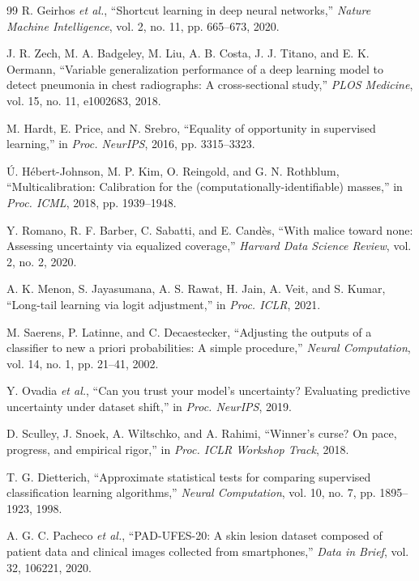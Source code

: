 \documentclass[journal]{IEEEtran}
\begin{document}
\begin{thebibliography}{99}
 R. Geirhos \emph{et al.}, ``Shortcut learning in deep neural
networks,'' \emph{Nature Machine Intelligence}, vol. 2, no. 11, pp. 665--673, 2020.

 J. R. Zech, M. A. Badgeley, M. Liu, A. B. Costa, J. J. Titano,
and E. K. Oermann, ``Variable generalization performance of a deep learning model to detect
pneumonia in chest radiographs: A cross-sectional study,'' \emph{PLOS Medicine}, vol. 15,
no. 11, e1002683, 2018.

 M. Hardt, E. Price, and N. Srebro, ``Equality of opportunity in
supervised learning,'' in \emph{Proc. NeurIPS}, 2016, pp. 3315--3323.

 \'{U}. H\'{e}bert-Johnson, M. P. Kim, O.
Reingold, and G. N. Rothblum, ``Multicalibration: Calibration for the
(computationally-identifiable) masses,'' in \emph{Proc. ICML}, 2018, pp. 1939--1948.

 Y. Romano, R. F. Barber, C. Sabatti, and E. Cand\`{e}s, ``With
malice toward none: Assessing uncertainty via equalized coverage,'' \emph{Harvard Data
Science Review}, vol. 2, no. 2, 2020.

 A. K. Menon, S. Jayasumana, A. S. Rawat, H. Jain, A. Veit, and
S. Kumar, ``Long-tail learning via logit adjustment,'' in \emph{Proc. ICLR}, 2021.

 M. Saerens, P. Latinne, and C. Decaestecker, ``Adjusting the
outputs of a classifier to new a priori probabilities: A simple procedure,'' \emph{Neural
Computation}, vol. 14, no. 1, pp. 21--41, 2002.

 Y. Ovadia \emph{et al.}, ``Can you trust your model's uncertainty?
Evaluating predictive uncertainty under dataset shift,'' in \emph{Proc. NeurIPS}, 2019.

 D. Sculley, J. Snoek, A. Wiltschko, and A. Rahimi, ``Winner's
curse? On pace, progress, and empirical rigor,'' in \emph{Proc. ICLR Workshop Track}, 2018.

 T. G. Dietterich, ``Approximate statistical tests for comparing
supervised classification learning algorithms,'' \emph{Neural Computation}, vol. 10, no. 7,
pp. 1895--1923, 1998.

 A. G. C. Pacheco \emph{et al.}, ``PAD-UFES-20: A skin lesion
dataset composed of patient data and clinical images collected from smartphones,'' \emph{Data
in Brief}, vol. 32, 106221, 2020.


\end{thebibliography}
\end{document}
